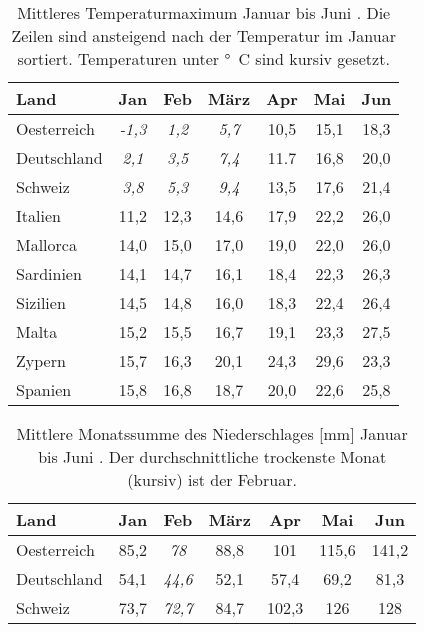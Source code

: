 \documentclass[a4paper,DIV13,BCOR0cm]{scrartcl}
\begin{document}
\begin{table}
        \centering
        \begin{tabular}{lcccccc}
                \toprule
                 Land & Jan & Feb & März & Apr & Mai & Jun \\
                 \midrule
                 Oesterreich     & \textit{-1,3} & \textit{1,2} & \textit{5,7} & 10,5 & 15,1 & 18,3 \\
                 Deutschland    & \textit{2,1} & \textit{3,5} & \textit{7,4} & 11.7 & 16,8 & 20,0 \\
                 Schweiz        & \textit{3,8} & \textit{5,3} & \textit{9,4} & 13,5 & 17,6 & 21,4 \\
                 Italien        & 11,2 & 12,3 & 14,6 & 17,9 & 22,2 & 26,0 \\
                Mallorca        & 14,0 & 15,0 & 17,0 & 19,0 & 22,0 & 26,0 \\
                Sardinien   & 14,1 & 14,7 & 16,1 & 18,4 & 22,3 & 26,3 \\
                Sizilien    & 14,5 & 14,8 & 16,0 & 18,3 & 22,4 & 26,4 \\
                Malta       & 15,2 & 15,5 & 16,7 & 19,1 & 23,3 & 27,5 \\
                 Zypern         & 15,7 & 16,3 & 20,1 & 24,3 & 29,6 & 23,3\\
                 Spanien        & 15,8 & 16,8 & 18,7 & 20,0 & 22,6 & 25,8 \\
                 \bottomrule
        \end{tabular}
        \caption{
            Mittleres Temperaturmaximum Januar bis Juni \protect\cite{rtl2015klima}.
            Die Zeilen sind ansteigend nach der Temperatur im Januar sortiert.
            Temperaturen unter \protect\unit[10]{\degree C} sind kursiv gesetzt.
            }
        \label{tab:tempmax}
\end{table}


\begin{table}
        \centering
        \begin{tabular}{lcccccc}
                \toprule
                 Land & Jan & Feb & März & Apr & Mai & Jun \\
                 \midrule
                 Oesterreich     & 85,2 & \textit{78} & 88,8 & 101 & 115,6 & 141,2 \\
                 Deutschland    & 54,1 & \textit{44,6} & 52,1 & 57,4 & 69,2 & 81,3 \\
                 Schweiz        & 73,7 & \textit{72,7} & 84,7 & 102,3 & 126 & 128 \\
                 \bottomrule
        \end{tabular}
        \caption{
                Mittlere Monatssumme des Niederschlages [mm] Januar bis Juni \protect\cite{rtl2015klima}.
                Der durchschnittliche trockenste Monat (kursiv) ist der Februar.
            }
        \label{tab:niederschlag}
\end{table}
\end{document}
